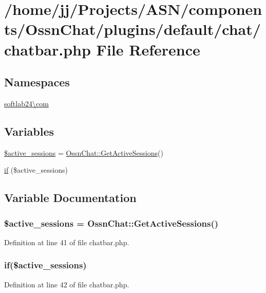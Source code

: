 \hypertarget{chatbar_8php}{}\section{/home/jj/\+Projects/\+A\+S\+N/components/\+Ossn\+Chat/plugins/default/chat/chatbar.php File Reference}
\label{chatbar_8php}
\subsection*{Namespaces}
\begin{DoxyCompactItemize}
\item 
 \hyperlink{namespacesoftlab24_1_1com}{softlab24\textbackslash{}com}
\end{DoxyCompactItemize}
\subsection*{Variables}
\begin{DoxyCompactItemize}
\item 
\hyperlink{chatbar_8php_a6681a273192c19abe6db05e410162e13}{\$active\+\_\+sessions} = \hyperlink{class_ossn_chat_ab7560516e7bbdae5aa7529f3d9fa870a}{Ossn\+Chat\+::\+Get\+Active\+Sessions}()
\item 
\hyperlink{chatbar_8php_a603ab771f1ac10dabe84fe638d367b2e}{if} (\$active\+\_\+sessions)
\end{DoxyCompactItemize}


\subsection{Variable Documentation}
\subsubsection[{\texorpdfstring{\$active\+\_\+sessions}{$active_sessions}}]{\setlength{\rightskip}{0pt plus 5cm}\$active\+\_\+sessions = {\bf Ossn\+Chat\+::\+Get\+Active\+Sessions}()}\hypertarget{chatbar_8php_a6681a273192c19abe6db05e410162e13}{}\label{chatbar_8php_a6681a273192c19abe6db05e410162e13}


Definition at line 41 of file chatbar.\+php.

\subsubsection[{\texorpdfstring{if}{if}}]{\setlength{\rightskip}{0pt plus 5cm}if(\$active\+\_\+sessions)}\hypertarget{chatbar_8php_a603ab771f1ac10dabe84fe638d367b2e}{}\label{chatbar_8php_a603ab771f1ac10dabe84fe638d367b2e}


Definition at line 42 of file chatbar.\+php.


